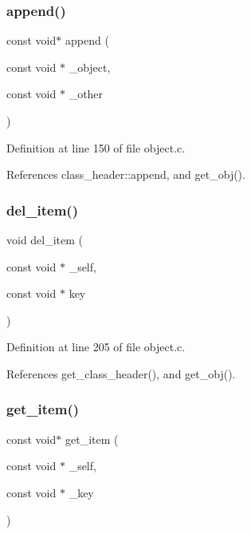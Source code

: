 \subsubsection{\texorpdfstring{append()}{append()}}
{\footnotesize\ttfamily const void$\ast$ append (\begin{DoxyParamCaption}\item[{const void $\ast$}]{\+\_\+object,  }\item[{const void $\ast$}]{\+\_\+other }\end{DoxyParamCaption})}



Definition at line 150 of file object.\+c.



References class\+\_\+header\+::append, and get\+\_\+obj().

\mbox{\label{group__collection_ga8b99290b943601321e5bf291daecaae3}} 
\subsubsection{\texorpdfstring{del\+\_\+item()}{del\_item()}}
{\footnotesize\ttfamily void del\+\_\+item (\begin{DoxyParamCaption}\item[{const void $\ast$}]{\+\_\+self,  }\item[{const void $\ast$}]{key }\end{DoxyParamCaption})}



Definition at line 205 of file object.\+c.



References get\+\_\+class\+\_\+header(), and get\+\_\+obj().

\mbox{\label{group__collection_gaa467fc1e6a3036f13ea20b36a6e672a1}} 
\subsubsection{\texorpdfstring{get\+\_\+item()}{get\_item()}}
{\footnotesize\ttfamily const void$\ast$ get\+\_\+item (\begin{DoxyParamCaption}\item[{const void $\ast$}]{\+\_\+self,  }\item[{const void $\ast$}]{\+\_\+key }\end{DoxyParamCaption})}



